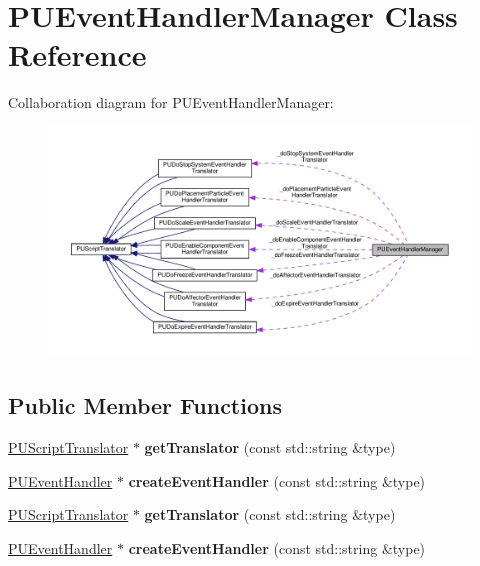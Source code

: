 \hypertarget{classPUEventHandlerManager}{}\section{P\+U\+Event\+Handler\+Manager Class Reference}
\label{classPUEventHandlerManager}


Collaboration diagram for P\+U\+Event\+Handler\+Manager\+:
\nopagebreak
\begin{figure}[H]
\begin{center}
\leavevmode
\includegraphics[width=350pt]{classPUEventHandlerManager__coll__graph}
\end{center}
\end{figure}
\subsection*{Public Member Functions}
\begin{DoxyCompactItemize}
\item 
\mbox{\label{classPUEventHandlerManager_aead61f20335d9fcffe54c27d35a559f1}} 
\hyperlink{classPUScriptTranslator}{P\+U\+Script\+Translator} $\ast$ {\bfseries get\+Translator} (const std\+::string \&type)
\item 
\mbox{\label{classPUEventHandlerManager_a736eb6527fad8699caaedf628632879e}} 
\hyperlink{classPUEventHandler}{P\+U\+Event\+Handler} $\ast$ {\bfseries create\+Event\+Handler} (const std\+::string \&type)
\item 
\mbox{\label{classPUEventHandlerManager_acf9a1a3fb969b29f712d17be5bad17fa}} 
\hyperlink{classPUScriptTranslator}{P\+U\+Script\+Translator} $\ast$ {\bfseries get\+Translator} (const std\+::string \&type)
\item 
\mbox{\label{classPUEventHandlerManager_a1f3a4cc5298c04207eb592f8595b29d1}} 
\hyperlink{classPUEventHandler}{P\+U\+Event\+Handler} $\ast$ {\bfseries create\+Event\+Handler} (const std\+::string \&type)
\end{DoxyCompactItemize}
